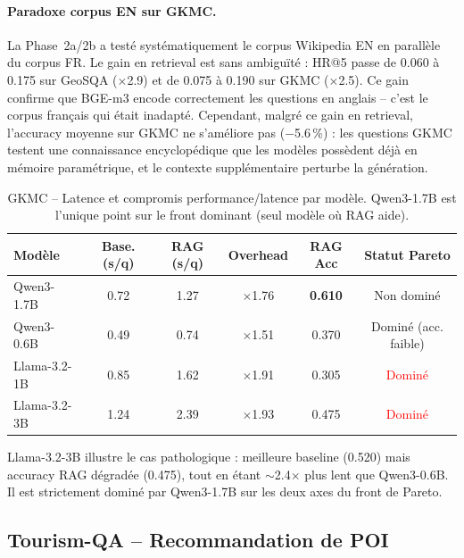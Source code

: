 \documentclass[12pt,a4paper]{article}
\begin{document}
\paragraph{Paradoxe corpus EN sur GKMC.}
La Phase~2a/2b a test\'e syst\'ematiquement le corpus Wikipedia EN en parall\`ele du corpus FR.
Le gain en retrieval est sans ambigu\"it\'e : HR@5 passe de 0.060 \`a 0.175 sur GeoSQA
($\times$2.9) et de 0.075 \`a 0.190 sur GKMC ($\times$2.5). Ce gain confirme que BGE-m3 encode
correctement les questions en anglais -- c'est le corpus fran\c{c}ais qui \'etait inadapt\'e.
Cependant, malgr\'e ce gain en retrieval, l'accuracy moyenne sur GKMC ne s'am\'eliore pas
($-$5.6\,\%) : les questions GKMC testent une connaissance encyclop\'edique que les mod\`eles
poss\`edent d\'ej\`a en m\'emoire param\'etrique, et le contexte suppl\'ementaire perturbe
la g\'en\'eration.

\begin{table}[H]
\centering
\caption{GKMC -- Latence et compromis performance/latence par mod\`ele.
  Qwen3-1.7B est l'unique point sur le front dominant (seul mod\`ele o\`u RAG aide).}
\label{tab:pareto_gkmc}
\begin{tabular}{@{} l c c c c c @{}}
\toprule
\textbf{Mod\`ele} & \textbf{Base. (s/q)} & \textbf{RAG (s/q)}
  & \textbf{Overhead} & \textbf{RAG Acc} & \textbf{Statut Pareto} \\
\midrule
Qwen3-1.7B   & 0.72 & 1.27 & $\times$1.76 & \textbf{0.610}
  & \textcolor{green!60!black}{Non domin\'e} \\
\rowcolor{lightgray}
Qwen3-0.6B   & 0.49 & 0.74 & $\times$1.51 & 0.370
  & Domin\'e (acc. faible) \\
Llama-3.2-1B & 0.85 & 1.62 & $\times$1.91 & 0.305
  & \textcolor{red}{Domin\'e} \\
\rowcolor{lightgray}
Llama-3.2-3B & 1.24 & 2.39 & $\times$1.93 & 0.475
  & \textcolor{red}{Domin\'e} \\
\bottomrule
\end{tabular}
\end{table}

Llama-3.2-3B illustre le cas pathologique : meilleure baseline (0.520) mais accuracy RAG
d\'egrad\'ee (0.475), tout en \'etant $\sim$2.4$\times$ plus lent que Qwen3-0.6B. Il est
strictement domin\'e par Qwen3-1.7B sur les deux axes du front de Pareto.

\subsection{Tourism-QA -- Recommandation de POI}
\label{sec:tourismqa}
\end{document}

